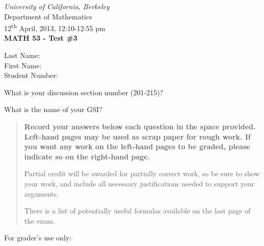 \documentclass[12pt]{article}
\newcommand{\points}[1]{\marginpar{\hspace{24pt}[#1]}}
\newcommand{\skipline}{\vspace{12pt}}
\begin{document}
\author{Instructor: Sean Fitzpatrick}
\thispagestyle{plain}
\begin{center}
\emph{University of California, Berkeley}\\
Department of Mathematics\\
12\textsuperscript{th} April, 2013, 12:10-12:55 pm\\
{\bf MATH 53 - Test \#3}\\
\end{center}
\skipline \skipline  \noindent \skipline
Last Name:\underline{\hspace{350pt}}\\
\skipline
First Name:\underline{\hspace{348pt}}\\
\skipline
Student Number:\underline{\hspace{322pt}}

\skipline
\noindent What is your discussion section number (201-215)?\points{1} \underline{\hspace{144pt}}

\skipline
\noindent What is the name of your GSI?\points{1} \underline{\hspace{245pt}} \\

\vspace{0.5in}


\begin{quote}
 {\bf Record your answers below each question in the space provided.    Left-hand pages may be used as scrap paper for rough work.  If you want any work on the left-hand pages to be graded, please indicate so on the right-hand page.
 
 \bigskip
 
Partial credit will be awarded for partially correct work, so be sure to show your work, and include all necessary justifications needed to support your arguments. 

There is a list of potentially useful formulas available on the last page of the exam.}
\end{quote}


\vspace{0.5in}

For grader's use only:
\end{document}
